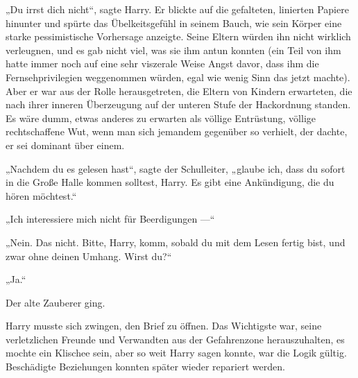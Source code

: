 „Du irrst dich nicht“, sagte Harry. Er blickte auf die gefalteten, linierten Papiere hinunter und spürte das Übelkeitsgefühl in seinem Bauch, wie sein Körper eine starke pessimistische Vorhersage anzeigte. Seine Eltern würden ihn nicht wirklich verleugnen, und es gab nicht viel, was sie ihm antun konnten (ein Teil von ihm hatte immer noch auf eine sehr viszerale Weise Angst davor, dass ihm die Fernsehprivilegien weggenommen würden, egal wie wenig Sinn das jetzt machte). Aber er war aus der Rolle herausgetreten, die Eltern von Kindern erwarteten, die nach ihrer inneren Überzeugung auf der unteren Stufe der Hackordnung standen. Es wäre dumm, etwas anderes zu erwarten als völlige Entrüstung, völlige rechtschaffene Wut, wenn man sich jemandem gegenüber so verhielt, der dachte, er sei dominant über einem.

„Nachdem du es gelesen hast“, sagte der Schulleiter, „glaube ich, dass du sofort in die Große Halle kommen solltest, Harry. Es gibt eine Ankündigung, die du hören möchtest.“

„Ich interessiere mich nicht für Beerdigungen —“

„Nein. Das nicht. Bitte, Harry, komm, sobald du mit dem Lesen fertig bist, und zwar ohne deinen Umhang. Wirst du?“

„Ja.“

Der alte Zauberer ging.

Harry musste sich zwingen, den Brief zu öffnen. Das Wichtigste war, seine verletzlichen Freunde und Verwandten aus der Gefahrenzone herauszuhalten, es mochte ein Klischee sein, aber so weit Harry sagen konnte, war die Logik gültig. Beschädigte Beziehungen konnten später wieder repariert werden.

